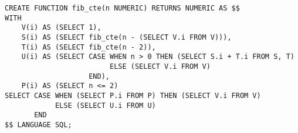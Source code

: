 \begin{verbatim}
CREATE FUNCTION fib_cte(n NUMERIC) RETURNS NUMERIC AS $$
WITH
    V(i) AS (SELECT 1),
    S(i) AS (SELECT fib_cte(n - (SELECT V.i FROM V))),
    T(i) AS (SELECT fib_cte(n - 2)),
    U(i) AS (SELECT CASE WHEN n > 0 THEN (SELECT S.i + T.i FROM S, T)
                         ELSE (SELECT V.i FROM V)
                    END),
    P(i) AS (SELECT n <= 2)
SELECT CASE WHEN (SELECT P.i FROM P) THEN (SELECT V.i FROM V)
            ELSE (SELECT U.i FROM U)
       END
$$ LANGUAGE SQL;
\end{verbatim}